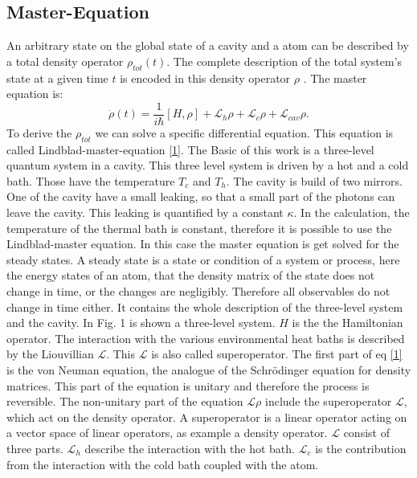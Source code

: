 \documentclass[12pt,a4paper]{article}
\begin{document}
\subsection{Master-Equation} 
An arbitrary state on the global state of a cavity and a atom can be described by a total density operator $\rho_{tot}(t)$. %
The complete description of the total system's state at a given time $t$ is encoded in this density 
operator $\rho$ \cite{Li2017}.
The master equation is:
\begin{equation}
\dot{\rho}(t)=\frac{1}{i \hbar}[H,\rho]+ \mathcal{L}_{h}\rho+ \mathcal{L}_{c}\rho+ \mathcal{L}_{cav}\rho. \label{1}
\end{equation}
To derive the $\rho_{tot}$ we can solve a specific differential equation. This equation is called Lindblad-master-equation \eqref{1}. 
The Basic of this work is a three-level quantum system in a cavity. This three level system is driven by a hot and a cold bath. Those have the temperature $T_c$ and $T_h$. The cavity is build of two mirrors. One of the cavity have a small leaking, so that a small part of the photons can leave the cavity. This leaking is quantified by a constant $\kappa$.
In the calculation, the temperature of the thermal bath is constant, therefore 
it is possible to use the Lindblad-master equation. 
In this case the master equation is get solved for the steady states.
A steady state is a state or condition of a system or process, here the energy states of an atom, that the density matrix of the state does not change in time, or the changes are negligibly. Therefore all observables do not change in time either. 
It contains the whole description of the three-level system and the cavity.
In Fig. 1 is shown a three-level system.
$H$ is the the Hamiltonian operator. The interaction with the various environmental heat baths is described by the Liouvillian $\mathcal{L}$. This $\mathcal{L}$ is also called superoperator. 
The first part of eq \eqref{1} is the von Neuman equation,  the analogue of the Schrödinger equation for density matrices. This part of the equation is unitary and therefore the process is reversible.
The non-unitary part of the equation $\mathcal{L}\rho$ include the superoperator $\mathcal{L}$, which act on the density operator.  A superoperator is a linear operator acting on a vector space of linear operators, as example a density operator.
$\mathcal{L}$ consist of three parts. $\mathcal{L}_h $ describe the interaction with the hot bath.
$\mathcal{L}_c$ is the contribution from the interaction with the cold bath coupled with the atom.
\end{document}
